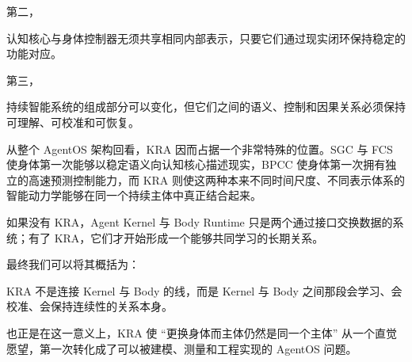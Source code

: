 第二，
\begin{statementbox}
\centering
{}
\end{statementbox}
认知核心与身体控制器无须共享相同内部表示，只要它们通过现实闭环保持稳定的功能对应。

第三，
\begin{statementbox}
\centering
{}
\end{statementbox}
持续智能系统的组成部分可以变化，但它们之间的语义、控制和因果关系必须保持可理解、可校准和可恢复。

从整个 AgentOS 架构回看，KRA 因而占据一个非常特殊的位置。SGC 与 FCS 使身体第一次能够以稳定语义向认知核心描述现实，BPCC 使身体第一次拥有独立的高速预测控制能力，而 KRA 则使这两种本来不同时间尺度、不同表示体系的智能动力学能够在同一个持续主体中真正结合起来。

如果没有 KRA，Agent Kernel 与 Body Runtime 只是两个通过接口交换数据的系统；有了 KRA，它们才开始形成一个能够共同学习的长期关系。

最终我们可以将其概括为：
\begin{conclusion}
KRA 不是连接 Kernel 与 Body 的线，而是 Kernel 与 Body 之间那段会学习、会校准、会保持连续性的关系本身。
\end{conclusion}

也正是在这一意义上，KRA 使 ``更换身体而主体仍然是同一个主体'' 从一个直觉愿望，第一次转化成了可以被建模、测量和工程实现的 AgentOS 问题。
